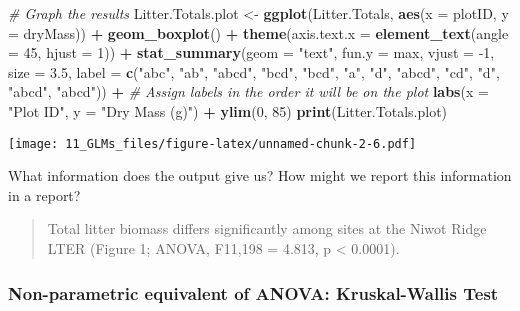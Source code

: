 \documentclass[
]{article}
\newenvironment{Shaded}{\begin{snugshade}}{\end{snugshade}}
\newcommand{\CommentTok}[1]{\textcolor[rgb]{0.56,0.35,0.01}{\textit{#1}}}
\newcommand{\DataTypeTok}[1]{\textcolor[rgb]{0.13,0.29,0.53}{#1}}
\newcommand{\DecValTok}[1]{\textcolor[rgb]{0.00,0.00,0.81}{#1}}
\newcommand{\FloatTok}[1]{\textcolor[rgb]{0.00,0.00,0.81}{#1}}
\newcommand{\KeywordTok}[1]{\textcolor[rgb]{0.13,0.29,0.53}{\textbf{#1}}}
\newcommand{\NormalTok}[1]{#1}
\newcommand{\OperatorTok}[1]{\textcolor[rgb]{0.81,0.36,0.00}{\textbf{#1}}}
\newcommand{\StringTok}[1]{\textcolor[rgb]{0.31,0.60,0.02}{#1}}
\begin{document}
\begin{Shaded}
\begin{Highlighting}[]
\CommentTok{# Graph the results}
\NormalTok{Litter.Totals.plot <-}\StringTok{ }\KeywordTok{ggplot}\NormalTok{(Litter.Totals, }\KeywordTok{aes}\NormalTok{(}\DataTypeTok{x =}\NormalTok{ plotID, }\DataTypeTok{y =}\NormalTok{ dryMass)) }\OperatorTok{+}
\StringTok{  }\KeywordTok{geom_boxplot}\NormalTok{() }\OperatorTok{+}
\StringTok{  }\KeywordTok{theme}\NormalTok{(}\DataTypeTok{axis.text.x =} \KeywordTok{element_text}\NormalTok{(}\DataTypeTok{angle =} \DecValTok{45}\NormalTok{, }\DataTypeTok{hjust =} \DecValTok{1}\NormalTok{)) }\OperatorTok{+}
\StringTok{  }\KeywordTok{stat_summary}\NormalTok{(}\DataTypeTok{geom =} \StringTok{"text"}\NormalTok{, }\DataTypeTok{fun.y =}\NormalTok{ max, }\DataTypeTok{vjust =} \DecValTok{-1}\NormalTok{, }\DataTypeTok{size =} \FloatTok{3.5}\NormalTok{,}
               \DataTypeTok{label =} \KeywordTok{c}\NormalTok{(}\StringTok{"abc"}\NormalTok{, }\StringTok{"ab"}\NormalTok{, }\StringTok{"abcd"}\NormalTok{, }\StringTok{"bcd"}\NormalTok{, }\StringTok{"bcd"}\NormalTok{, }\StringTok{"a"}\NormalTok{, }
                         \StringTok{"d"}\NormalTok{, }\StringTok{"abcd"}\NormalTok{, }\StringTok{"cd"}\NormalTok{, }\StringTok{"d"}\NormalTok{, }\StringTok{"abcd"}\NormalTok{, }\StringTok{"abcd"}\NormalTok{)) }\OperatorTok{+}\StringTok{ }\CommentTok{# Assign labels in the order it will be on the plot}
\StringTok{  }\KeywordTok{labs}\NormalTok{(}\DataTypeTok{x =} \StringTok{"Plot ID"}\NormalTok{, }\DataTypeTok{y =} \StringTok{"Dry Mass (g)"}\NormalTok{) }\OperatorTok{+}
\StringTok{  }\KeywordTok{ylim}\NormalTok{(}\DecValTok{0}\NormalTok{, }\DecValTok{85}\NormalTok{)}
\KeywordTok{print}\NormalTok{(Litter.Totals.plot)}
\end{Highlighting}
\end{Shaded}

\texttt{[image: 11\_GLMs\_files/figure-latex/unnamed-chunk-2-6.pdf]}

What information does the output give us? How might we report this
information in a report?

\begin{quote}
Total litter biomass differs significantly among sites at the Niwot
Ridge LTER (Figure 1; ANOVA, F11,198 = 4.813, p \textless{} 0.0001).
\end{quote}

\hypertarget{non-parametric-equivalent-of-anova-kruskal-wallis-test}{%
\subsubsection{Non-parametric equivalent of ANOVA: Kruskal-Wallis
Test}\label{non-parametric-equivalent-of-anova-kruskal-wallis-test}}
\end{document}
